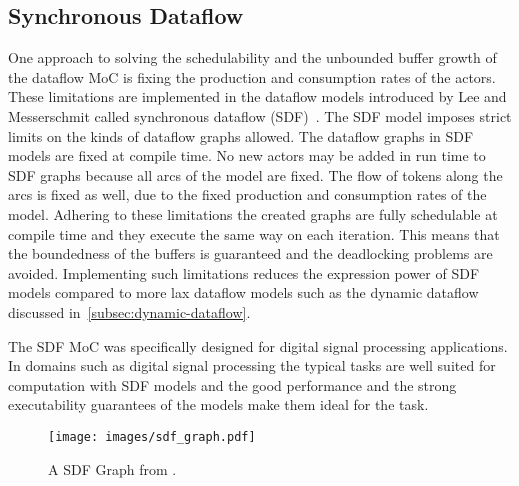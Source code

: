 \subsection{Synchronous Dataflow}
\label{subsec:synchronous-dataflow}
\FloatBarrier
One approach to solving the schedulability and the unbounded buffer growth of the dataflow MoC is fixing the production and consumption rates of the actors. These limitations are implemented in the dataflow models introduced by Lee and Messerschmit called synchronous dataflow (SDF)~\cite{lee1987synchronous}. The SDF model imposes strict limits on the kinds of dataflow graphs allowed. The dataflow graphs in SDF models are fixed at compile time. No new actors may be added in run time to SDF graphs because all arcs of the model are fixed. The flow of tokens along the arcs is fixed as well, due to the fixed production and consumption rates of the model. Adhering to these limitations the created graphs are fully schedulable at compile time and they execute the same way on each iteration. This means that the boundedness of the buffers is guaranteed and the deadlocking problems are avoided. Implementing such limitations reduces the expression power of SDF models compared to more lax dataflow models such as the dynamic dataflow discussed in~\ref{subsec:dynamic-dataflow}.~\cite{lee2015introduction}

The SDF MoC was specifically designed for digital signal processing applications. In domains such as digital signal processing the typical tasks are well suited for computation with SDF models and the good performance and the strong executability guarantees of the models make them ideal for the task.~\cite{lee2015introduction}

\begin{figure}[h!]
    \begin{center}
        \texttt{[image: images/sdf\_graph.pdf]}
        \caption{A SDF Graph from \cite{ade1997data}.}
        \label{fig:sdf_graph}
    \end{center}
\end{figure}

